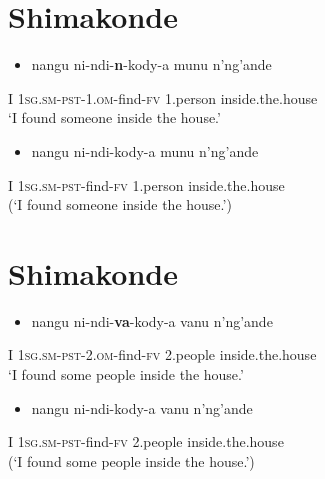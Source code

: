 \documentclass[output=paper]{langsci/langscibook}
\begin{document}
\chapter[Shimakonde]{Shimakonde}
\label{bkm:Ref455884451}\setcounter{itemize}{0}
\begin{itemize}
\item \gll nangu       ni-ndi-\textbf{n}{}-kody-a                      munu            n'ng'ande\\
\end{itemize}
     I               \textsc{1sg.sm-pst}{}-1.\textsc{om}{}-find-\textsc{fv}       1.person       inside.the.house\\
\glt ‘I found someone inside the house.’
\z

\begin{itemize}
\item \gll *nangu     ni-ndi-kody-a                         munu            n'ng'ande\\
\end{itemize}
     I               \textsc{1sg.sm-pst}{}-find-\textsc{fv}                1.person       inside.the.house\\
\glt (‘I found someone inside the house.’)
\z

\chapter[Shimakonde]{Shimakonde}
\label{bkm:Ref455884455}\setcounter{itemize}{0}
\begin{itemize}
\item \gll nangu      ni-ndi-\textbf{va}{}-kody-a                     vanu             n'ng'ande\\
\end{itemize}
     I              \textsc{1sg.sm-pst-2.om}{}-find-\textsc{fv}        2.people       inside.the.house\\
\glt ‘I found some people inside the house.’
\z

\begin{itemize}
\item \gll *nangu     ni-ndi-kody-a                        vanu              n'ng'ande\\
\end{itemize}
     I               \textsc{1sg.sm-pst}{}-find-\textsc{fv}               2.people        inside.the.house\\
\glt (‘I found some people inside the house.’)
\z
\end{document}
